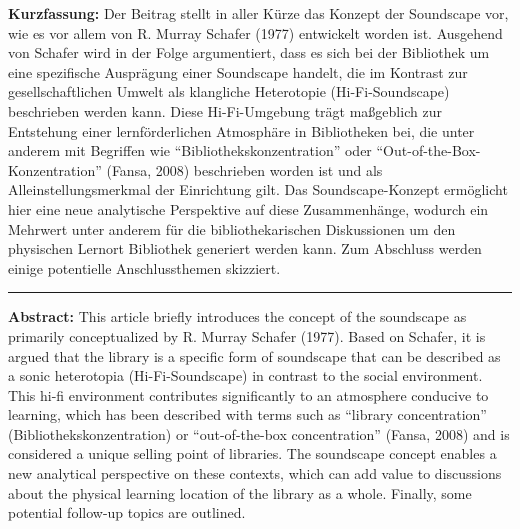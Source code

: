 \textbf{Kurzfassung:} Der Beitrag stellt in aller Kürze das Konzept der
Soundscape vor, wie es vor allem von R. Murray Schafer (1977) entwickelt
worden ist. Ausgehend von Schafer wird in der Folge argumentiert, dass
es sich bei der Bibliothek um eine spezifische Ausprägung einer
Soundscape handelt, die im Kontrast zur gesellschaftlichen Umwelt als
klangliche Heterotopie (Hi-Fi-Soundscape) beschrieben werden kann. Diese
Hi-Fi-Umgebung trägt maßgeblich zur Entstehung einer lernförderlichen
Atmosphäre in Bibliotheken bei, die unter anderem mit Begriffen wie
\enquote{Bibliothekskonzentration} oder \enquote{Out-of-the-Box-Konzentration}
(Fansa, 2008) beschrieben worden ist und als Alleinstellungsmerkmal der
Einrichtung gilt. Das Soundscape-Konzept ermöglicht hier eine neue
analytische Perspektive auf diese Zusammenhänge, wodurch ein Mehrwert
unter anderem für die bibliothekarischen Diskussionen um den physischen
Lernort Bibliothek generiert werden kann. Zum Abschluss werden einige
potentielle Anschlussthemen skizziert.

\begin{center}\rule{0.5\linewidth}{0.5pt}\end{center}

\textbf{Abstract:} This article briefly introduces the concept of the
soundscape as primarily conceptualized by R. Murray Schafer (1977).
Based on Schafer, it is argued that the library is a specific form of
soundscape that can be described as a sonic heterotopia
(Hi-Fi-Soundscape) in contrast to the social environment. This hi-fi
environment contributes significantly to an atmosphere conducive to
learning, which has been described with terms such as \enquote{library
concentration} (Bibliothekskonzentration) or \enquote{out-of-the-box
concentration} (Fansa, 2008) and is considered a unique selling point
of libraries. The soundscape concept enables a new analytical
perspective on these contexts, which can add value to discussions about
the physical learning location of the library as a whole. Finally, some
potential follow-up topics are outlined.